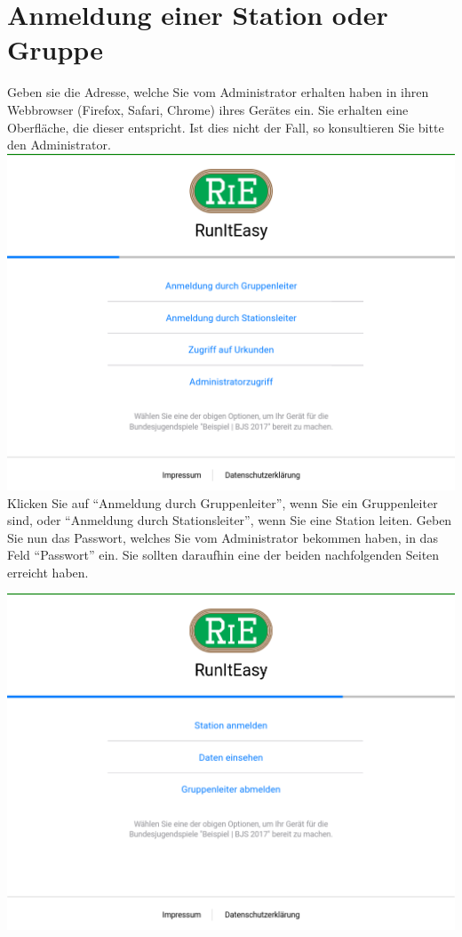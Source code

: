 \documentclass[11pt,a4paper,titlepage,german]{article}
\begin{document}
		\section[Anmeldung]{Anmeldung einer Station oder Gruppe}
			\label{login}
			Geben sie die Adresse, welche Sie vom Administrator erhalten haben in ihren Webbrowser (Firefox, Safari, Chrome) ihres Gerätes ein. Sie erhalten eine Oberfläche, die dieser entspricht. Ist dies nicht der Fall, so konsultieren Sie bitte den Administrator.\\
			\includegraphics[width=\textwidth]{Login.png}
			Klicken Sie auf “Anmeldung durch Gruppenleiter”, wenn Sie ein Gruppenleiter sind, oder “Anmeldung durch Stationsleiter”, wenn Sie eine Station leiten. Geben Sie nun das Passwort, welches Sie vom Administrator bekommen haben, in das Feld “Passwort” ein. Sie sollten daraufhin eine der beiden nachfolgenden Seiten erreicht haben.\\
			\includegraphics[width=\textwidth]{LoggedIn-Group}
\end{document}
